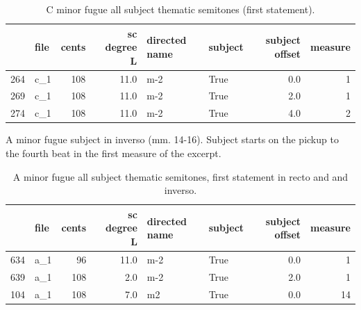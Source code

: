 \begin{singlespace}
\begin{table}[H]
\centering
\tiny
\begin{tabular}{|llrrllrr|}
\hline
\textbf{{}} & \textbf{file} & \textbf{ cents} & \textbf{ sc degree L} & \textbf{directed name} & \textbf{subject} & \textbf{ subject offset} & \textbf{ measure }\\
\hline
264 &  c\_1 &    108 &         11.0 &           m-2 &    True &             0.0 &        1 \\
269 &  c\_1 &    108 &         11.0 &           m-2 &    True &             2.0 &        1 \\
274 &  c\_1 &    108 &         11.0 &           m-2 &    True &             4.0 &        2 \\
\hline
\end{tabular}
\caption{C minor fugue all subject thematic semitones (first statement). }
\end{table}
\normalsize
\end{singlespace}




\begin{Example}[H]
\vspace{1.5em}
    \centering
    \caption[A minor fugue subject in inverso (mm. 14-16). ]{ A minor fugue subject in inverso (mm. 14-16). Subject starts on the pickup to the fourth beat in the first measure of the excerpt.}
\end{Example}    
\begin{singlespace}
\begin{table}[H]
\centering
\tiny
\begin{tabular}{|llrrllrr|}
\hline
\textbf{{}} & \textbf{file} & \textbf{ cents} & \textbf{ sc degree L} & \textbf{directed name} & \textbf{subject} & \textbf{ subject offset} & \textbf{ measure }\\
\hline
634 &  a\_1 &     96 &         11.0 &           m-2 &    True &             0.0 &        1 \\
639 &  a\_1 &    108 &          2.0 &           m-2 &    True &             2.0 &        1 \\
104 &  a\_1 &    108 &          7.0 &            m2 &    True &             0.0 &       14 \\
\hline
\end{tabular}
\caption{A minor fugue all subject thematic semitones, first statement in recto and and inverso. }
\end{table}
\normalsize
\end{singlespace}

